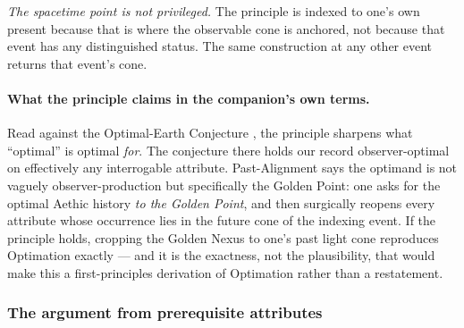 \emph{The spacetime point is not privileged.} The principle is indexed
to one's own present because that is where the observable cone is
anchored, not because that event has any distinguished status. The same
construction at any other event returns that event's cone.

\paragraph{What the principle claims in the companion's own terms.}\label{gc:rem:oec}
Read against the Optimal-Earth Conjecture \cite{AethusOptimalEarth}, the
principle sharpens what ``optimal'' is optimal \emph{for}. The
conjecture there holds our record observer-optimal on effectively any
interrogable attribute. Past-Alignment says the optimand is not
vaguely observer-production but specifically the Golden Point: one asks
for the optimal Aethic history \emph{to the Golden Point}, and then
surgically reopens every attribute whose occurrence lies in the future
cone of the indexing event. If the principle holds, cropping the Golden
Nexus to one's past light cone reproduces Optimation exactly --- and it
is the exactness, not the plausibility, that would make this a
first-principles derivation of Optimation rather than a restatement.

\subsubsection{The argument from prerequisite attributes}
\label{gc:subsub:pastalign-argument}

